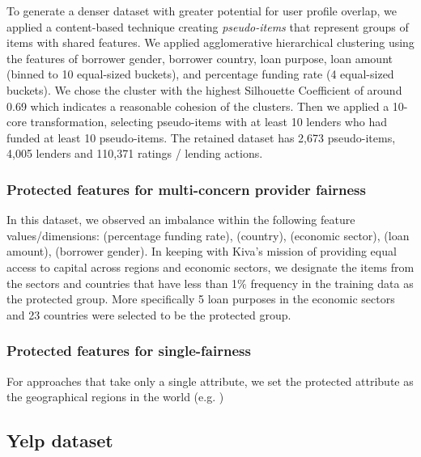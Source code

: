     To generate a denser dataset with greater potential for user profile overlap, we applied a content-based technique creating \textit{pseudo-items} that represent groups of items with shared features. We applied agglomerative hierarchical clustering \cite{rokach2005clustering} using the features of borrower gender, borrower country, loan purpose, loan amount (binned to 10 equal-sized buckets), and percentage funding rate (4 equal-sized buckets). We chose the cluster with the highest Silhouette Coefficient \cite{rousseeuw1987silhouettes} of around 0.69 which indicates a reasonable cohesion of the clusters. Then we applied a 10-core transformation, selecting pseudo-items with at least 10 lenders who had funded at least 10 pseudo-items. The retained dataset has 2,673 pseudo-items, 4,005 lenders and 110,371 ratings / lending actions.
    


        \subsubsection{Protected features for multi-concern provider fairness}
        In this dataset, we observed an imbalance within the following feature values/dimensions: (percentage funding rate), (country), (economic sector), (loan amount), (borrower gender). In keeping with Kiva's mission of providing equal access to capital across regions and economic sectors, we designate the items from the sectors and countries that have less than 1\% frequency in the training data as the protected group. More specifically 5 loan purposes in the economic sectors and 23 countries were selected to be the protected group. 
        
        \subsubsection{Protected features for single-fairness}
        For approaches that take only a single attribute, we set the protected attribute as the geographical regions in the world (e.g. )

    \subsection{Yelp dataset}
    
